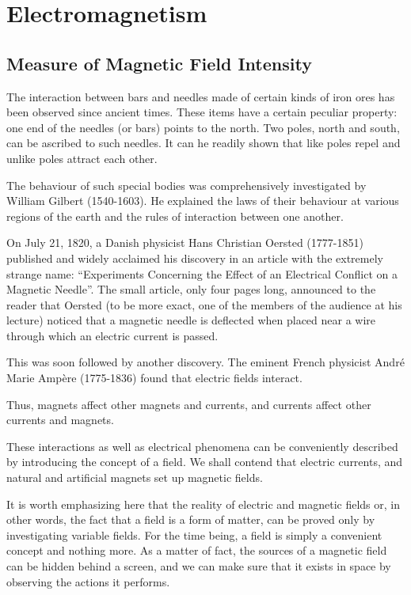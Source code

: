 

\cleardoublepage
\chapter{Electromagnetism}
\label{ch-03}

\section{Measure of Magnetic Field Intensity}

The interaction between bars and needles made of certain kinds of iron ores has been observed since ancient times. These items have a certain peculiar property: one end of the needles (or bars) points to the north. Two poles, north and south, can be ascribed to such needles. It can he readily shown that like poles repel and unlike poles attract each other.

The behaviour of such special bodies was comprehensively investigated by William Gilbert (1540-1603). He explained the laws of their behaviour at various regions of the earth and the rules of interaction between one another.


On July 21, 1820, a Danish physicist Hans Christian Oersted (1777-1851) published and widely acclaimed his discovery in an article with the extremely strange name: ``Experiments Concerning the Effect of an Electrical Conflict on a Magnetic Needle''. The small article, only four pages long, announced to the reader that Oersted (to be more exact, one of the members of the audience at his lecture) noticed that a magnetic needle is deflected when placed near a wire through which an electric current is passed.

This was soon followed by another discovery. The eminent French physicist Andr\'e Marie Amp\`ere (1775-1836) found that electric fields interact.

Thus, magnets affect other magnets and currents, and currents affect other currents and magnets.

These interactions as well as electrical phenomena can be conveniently described by introducing the concept of a field. We shall contend that electric currents, and natural and artificial magnets set up magnetic fields. 

It is worth emphasizing here that the reality of electric and magnetic fields or, in other words, the fact that a field is a form of matter, can be proved only by investigating variable fields. For the time being, a field is simply a convenient concept and nothing more. As a matter of fact, the sources of a magnetic field can be hidden behind a screen, and we can make sure that it exists in space by observing the actions it performs.

